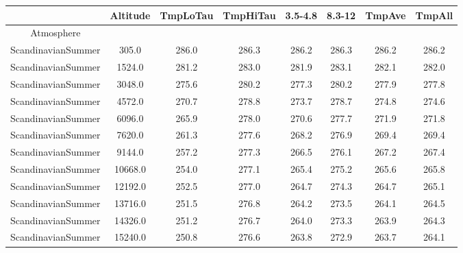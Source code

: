 \documentclass{workpackage}
\begin{document}
\begin{center}

\begin{normalsize}

\begin{tabular}{|c|c|c|c|c|c|c|c|}
\hline
&Altitude&TmpLoTau&TmpHiTau&3.5-4.8&8.3-12&TmpAve&TmpAll\\\hline
Atmosphere&&&&&&&\\\hline
ScandinavianSummer&305.0&286.0&286.3&286.2&286.3&286.2&286.2\\\hline
ScandinavianSummer&1524.0&281.2&283.0&281.9&283.1&282.1&282.0\\\hline
ScandinavianSummer&3048.0&275.6&280.2&277.3&280.2&277.9&277.8\\\hline
ScandinavianSummer&4572.0&270.7&278.8&273.7&278.7&274.8&274.6\\\hline
ScandinavianSummer&6096.0&265.9&278.0&270.6&277.7&271.9&271.8\\\hline
ScandinavianSummer&7620.0&261.3&277.6&268.2&276.9&269.4&269.4\\\hline
ScandinavianSummer&9144.0&257.2&277.3&266.5&276.1&267.2&267.4\\\hline
ScandinavianSummer&10668.0&254.0&277.1&265.4&275.2&265.6&265.8\\\hline
ScandinavianSummer&12192.0&252.5&277.0&264.7&274.3&264.7&265.1\\\hline
ScandinavianSummer&13716.0&251.5&276.8&264.2&273.5&264.1&264.5\\\hline
ScandinavianSummer&14326.0&251.2&276.7&264.0&273.3&263.9&264.3\\\hline
ScandinavianSummer&15240.0&250.8&276.6&263.8&272.9&263.7&264.1\\\hline

\end{tabular}
\end{normalsize}
\end{center}
\end{document}
